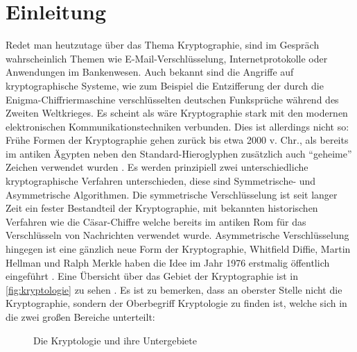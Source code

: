 \chapter{Einleitung}
Redet man heutzutage über das Thema Kryptographie, sind im Gespräch wahrscheinlich
Themen wie E-Mail-Verschlüsselung, Internetprotokolle oder Anwendungen im
Bankenwesen. Auch bekannt sind die Angriffe auf kryptographische Systeme,
wie zum Beispiel die Entzifferung der durch die Enigma-Chiffriermaschine
verschlüsselten deutschen Funksprüche während des Zweiten Weltkrieges. Es scheint als
wäre Kryptographie stark mit den modernen elektronischen Kommunikationstechniken
verbunden. Dies ist allerdings nicht so: Frühe Formen der Kryptographie
gehen zurück bis etwa 2000 v. Chr., als bereits im antiken Ägypten neben den
Standard-Hieroglyphen zusätzlich auch \enquote{geheime} Zeichen
verwendet wurden \parencite[2]{BOOK:crypto}. Es werden prinzipiell zwei
unterschiedliche kryptographische Verfahren unterschieden, diese sind
Symmetrische- und Asymmetrische Algorithmen. Die symmetrische Verschlüsselung ist
seit langer Zeit ein fester Bestandteil der Kryptographie, mit bekannten historischen
Verfahren wie die Cäsar-Chiffre welche bereits im antiken Rom für das Verschlüsseln von
Nachrichten verwendet wurde. Asymmetrische Verschlüsselung hingegen ist eine gänzlich neue Form
der Kryptographie, Whitfield Diffie, Martin Hellman und Ralph Merkle haben die Idee im Jahr
1976 erstmalig öffentlich eingeführt \parencite[3]{BOOK:crypto}.
Eine Übersicht über das Gebiet der Kryptographie ist in \autoref{fig:kryptologie}
zu sehen \parencite[3]{BOOK:crypto}.
Es ist zu bemerken, dass an oberster Stelle nicht die Kryptographie, sondern
der Oberbegriff Kryptologie zu finden ist, welche sich in die zwei großen Bereiche unterteilt:

\begin{figure}
  \begin{center}


  \end{center}
  \caption{Die Kryptologie und ihre Untergebiete}
  \label{fig:kryptologie}
\end{figure}

